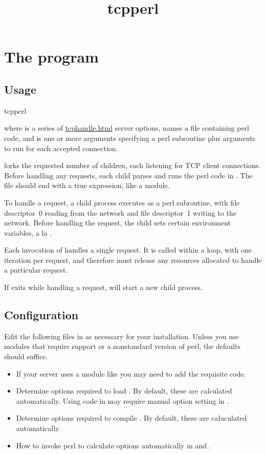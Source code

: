 \documentclass{book}
\title{tcpperl}
\begin{document}
\section{The  program}

\subsection{Usage}
\begin{code}%
  tcpperl   
\end{code}
where  is a series of \href{tcphandle}{tcphandle.html} server
options,  names a file containing perl code, and 
is one or more arguments specifying a perl subroutine plus arguments to
run for each accepted connection.

 forks the requested number of children, each listening for
TCP client connections.  Before handling any requests, each child parses
and runs the perl code in .  The file should end with a true
expression, like a module.

To handle a request, a child process executes  as a perl
subroutine, with file descriptor~0 reading from the network and file
descriptor~1 writing to the network.  Before handling the request, the
child sets certain environment variables, a la .

Each invocation of  handles a single request.  It is called
within a loop, with one iteration per request, and therefore must
release any resources allocated to handle a particular request.

If  exits while handling a request,  will
start a new child process.


\subsection{Configuration}
Edit the following files in  as necessary for your
installation.  Unless you use modules that require  support or a
nonstandard version of perl, the defaults should suffice.
\begin{itemize}
\item{}
  If your server uses a module like  you may need to add the
  requisite  code.

\item{}
  Determine options required to load .  By default,
  these are calculated automatically.  Using  code in
   may require manual option setting in
  .

\item{}
  Determine options required to compile .  By default,
  these are caluculated automatically.

\item{}
  How to invoke perl to calculate options automatically in
   and .
\end{itemize}
\end{document}
